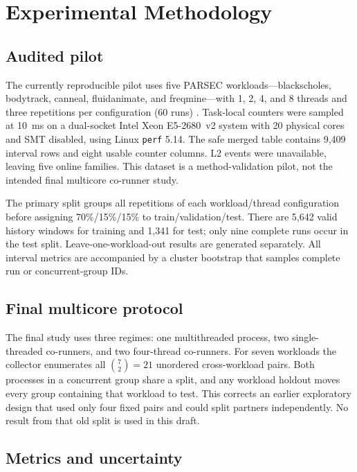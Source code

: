 \documentclass[conference,10pt]{IEEEtran}
\begin{document}
\section{Experimental Methodology}

\subsection{Audited pilot}

The currently reproducible pilot uses five PARSEC workloads---blackscholes, bodytrack,
canneal, fluidanimate, and freqmine---with 1, 2, 4, and 8 threads and three repetitions
per configuration (60 runs) \cite{bienia2008parsec}. Task-local counters were sampled
at 10~ms on a dual-socket Intel Xeon E5-2680~v2 system with 20 physical cores and SMT
disabled, using Linux \texttt{perf} 5.14. The safe merged table contains 9,409 interval
rows and eight usable counter columns. L2 events were unavailable, leaving five online
families. This dataset is a method-validation pilot, not the intended final multicore
co-runner study.

The primary split groups all repetitions of each workload/thread configuration before
assigning 70\%/15\%/15\% to train/validation/test. There are 5,642 valid history windows
for training and 1,341 for test; only nine complete runs occur in the test split.
Leave-one-workload-out results are generated separately. All interval metrics are
accompanied by a cluster bootstrap that samples complete run or concurrent-group IDs.

\subsection{Final multicore protocol}

The final study uses three regimes: one multithreaded process, two single-threaded
co-runners, and two four-thread co-runners. For seven workloads the collector enumerates
all $\binom{7}{2}=21$ unordered cross-workload pairs. Both processes in a concurrent
group share a split, and any workload holdout moves every group containing that
workload to test. This corrects an earlier exploratory design that used only four fixed
pairs and could split partners independently. No result from that old split is used in
this draft.

\subsection{Metrics and uncertainty}
\end{document}
